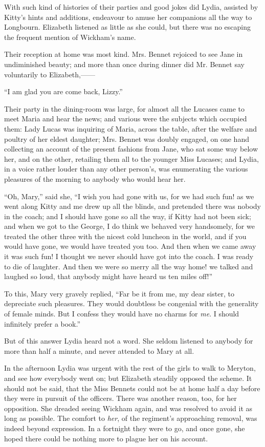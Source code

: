 \documentclass[12pt]{book}
\begin{document}
With such kind of histories of their parties and good jokes did Lydia, assisted by Kitty's hints and additions, endeavour to amuse her companions all the way to Longbourn. Elizabeth listened as little as she could, but there was no escaping the frequent mention of Wickham's name.

Their reception at home was most kind. Mrs. Bennet rejoiced to see Jane in undiminished beauty; and more than once during dinner did Mr. Bennet say voluntarily to Elizabeth,------

``I am glad you are come back, Lizzy.''

Their party in the dining-room was large, for almost all the Lucases came to meet Maria and hear the news; and various were the subjects which occupied them: Lady Lucas was inquiring of Maria, across the table, after the welfare and poultry of her eldest daughter; Mrs. Bennet was doubly engaged, on one hand collecting an account of the present fashions from Jane, who sat some way below her, and on the other, retailing them all to the younger Miss Lucases; and Lydia, in a voice rather louder than any other person's, was enumerating the various pleasures of the morning to anybody who would hear her.

``Oh, Mary,'' said she, ``I wish you had gone with us, for we had such fun! as we went along Kitty and me drew up all the blinds, and pretended there was nobody in the coach; and I should have gone so all the way, if Kitty had not been sick; and when we got to the George, I do think we behaved very handsomely, for we treated the other three with the nicest cold luncheon in the world, and if you would have gone, we would have treated you too. And then when we came away it was such fun! I thought we never should have got into the coach. I was ready to die of laughter. And then we were so merry all the way home! we talked and laughed so loud, that anybody might have heard us ten miles off!''

To this, Mary very gravely replied, ``Far be it from me, my dear sister, to depreciate such pleasures. They would doubtless be congenial with the generality of female minds. But I confess they would have no charms for \textit{me}. I should infinitely prefer a book.''

But of this answer Lydia heard not a word. She seldom listened to anybody for more than half a minute, and never attended to Mary at all.

In the afternoon Lydia was urgent with the rest of the girls to walk to Meryton, and see how everybody went on; but Elizabeth steadily opposed the scheme. It should not be said, that the Miss Bennets could not be at home half a day before they were in pursuit of the officers. There was another reason, too, for her opposition. She dreaded seeing Wickham again, and was resolved to avoid it as long as possible. The comfort to \textit{her}, of the regiment's approaching removal, was indeed beyond expression. In a fortnight they were to go, and once gone, she hoped there could be nothing more to plague her on his account.
\end{document}
